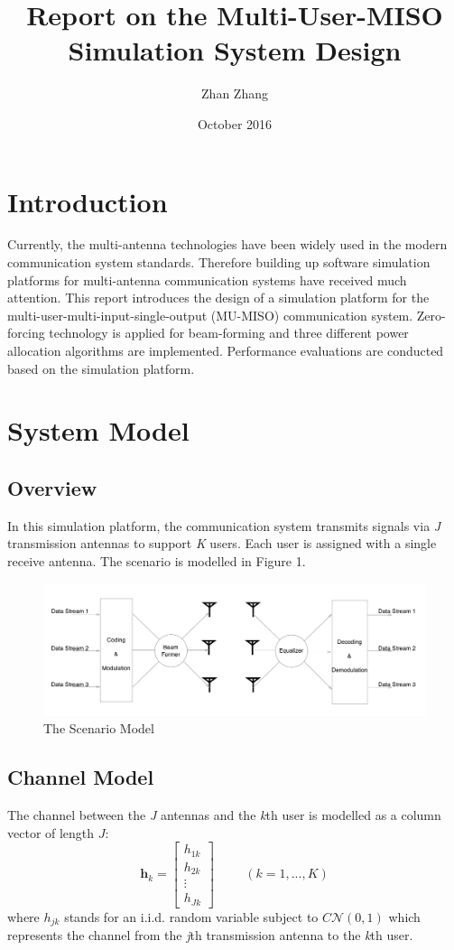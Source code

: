 \documentclass{article}
\title{Report on the Multi-User-MISO Simulation System Design}
\author{Zhan Zhang}
\date{October 2016}
\begin{document}
\maketitle

\section{Introduction}
Currently, the multi-antenna technologies have been widely used in the modern communication system standards.
Therefore building up software simulation platforms for multi-antenna communication systems have received much attention.
This report introduces the design of a simulation platform for
the multi-user-multi-input-single-output (MU-MISO) communication system.
Zero-forcing technology is applied for beam-forming and three different
power allocation algorithms are implemented. Performance evaluations are conducted based on the simulation platform.

\section{System Model}
\subsection{Overview}
In this simulation platform, the communication system transmits signals via \textit{J} transmission antennas to support \textit{K} users.
Each user is assigned with a single receive antenna. The scenario is modelled in Figure 1.
\begin{figure}[ht]
\centering
\includegraphics[scale=0.33]{Scenario.png}
\caption{The Scenario Model}
\label{fig:Scenario}
\end{figure}

\subsection{Channel Model}
The channel between the \textit{J} antennas and the \textit{k}th user is modelled as a column vector of length $\textit{J}$:
\[
\textbf{h}_k
=
\begin{bmatrix}
    h_{1k} \\
    h_{2k} \\
    \vdots\\
    h_{Jk}
\end{bmatrix} \hspace{1cm}(k = 1,...,K)
\]
where $h_{jk}$ stands for an i.i.d. random variable subject to $C\mathcal{N}(0,1)$ which represents the channel from the \textit{j}th
transmission antenna to the \textit{k}th user.
\end{document}
